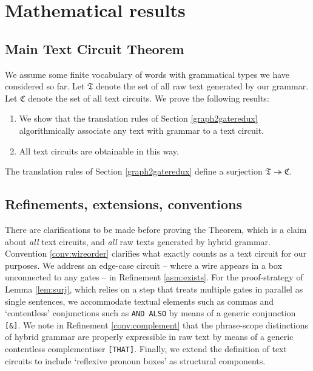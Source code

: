 \section{Mathematical results}\label{sec:thm}

\subsection{Main Text Circuit Theorem}\label{thm:main}
We assume some finite vocabulary of words with grammatical types we have considered so far.
Let $\mathfrak{T}$ denote the set of all raw text generated by our grammar.
Let $\mathfrak{C}$ denote the set of all text circuits. We prove the following results:
\begin{enumerate}
    \item We show that the translation rules of Section \ref{graph2gateredux} algorithmically associate any  text with  grammar to a text circuit.
    \item All text circuits are obtainable in this way.
\end{enumerate}

\begin{theorem}
The translation rules of Section \ref{graph2gateredux} define a surjection $\mathfrak{T} \twoheadrightarrow \mathfrak{C}$. 
\end{theorem}

\subsection{Refinements, extensions, conventions}\label{sec:asscon}

There are clarifications to be made before proving the Theorem, which is a claim about \emph{all} text circuits, and \emph{all} raw texts generated by hybrid grammar. Convention \ref{conv:wireorder} clarifies what exactly counts as a text circuit for our purposes. We address an edge-case circuit -- where a wire appears in a box unconnected to any gates -- in Refinement \ref{asm:exists}. For the proof-strategy of Lemma \ref{lem:surj}, which relies on a step that treats multiple gates in parallel as single sentences, we accommodate textual elements such as commas and `contentless' conjunctions such as \texttt{AND ALSO} by means of a generic conjunction \texttt{[\&]}. We note in Refinement \ref{conv:complement} that the phrase-scope distinctions of hybrid grammar are properly expressible in raw text by means of a generic contentless complementiser \texttt{[THAT]}. Finally, we extend the definition of text circuits to include `reflexive pronoun boxes' as structural components.

